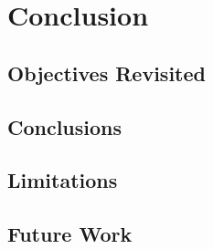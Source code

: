 
%


\chapter{Conclusion}
\label{cha:conclusion}

\section{Objectives Revisited}
\label{sec:conclusion-objectives}


\section{Conclusions}
\label{sec:conclusion-conclusions}


\section{Limitations}
\label{sec:conclusion-limitations}


\section{Future Work}
\label{sec:conclusion-future}

